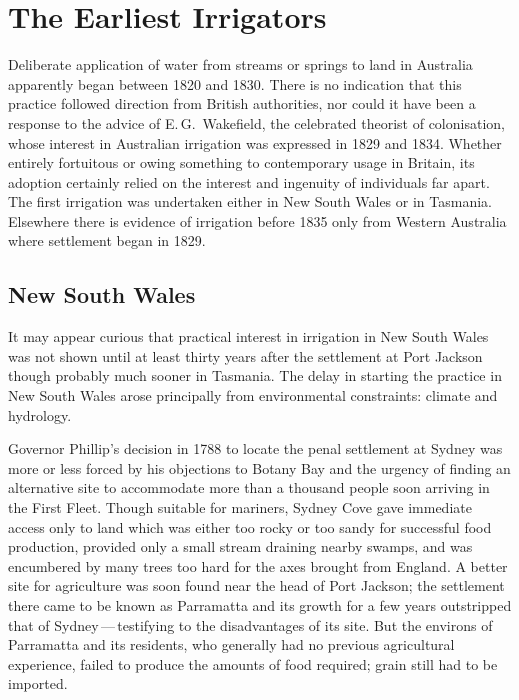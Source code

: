 
\chapter{The Earliest Irrigators}

\label{ch:early}

\setcounter{endnote}{0}

Deliberate application of water from streams or springs to land in
Australia apparently began between 1820 and 1830.  There is no
indication that this practice followed direction from British
authorities, nor could it have been a response to the advice of
E.\,G.~Wakefield, the celebrated theorist of
colonisation, whose interest in Australian irrigation was expressed in
1829 and 1834.  Whether entirely fortuitous or owing something to
contemporary usage in Britain, its adoption certainly
relied on the interest and ingenuity of individuals far apart.  The
first irrigation was undertaken either in New South Wales or in
Tasmania.  Elsewhere there is evidence of irrigation before 1835 only
from Western Australia where settlement began in 1829.

\section*{\textsf{New South Wales}}
\label{sec:nsw}

It may appear curious that practical interest in irrigation in New
South Wales was not shown until at least thirty years after the
settlement at Port Jackson though probably much sooner in Tasmania.
The delay in starting the practice in New South Wales arose
principally from environmental constraints: climate and hydrology.

Governor Phillip's decision in 1788 to locate
the penal settlement at Sydney was more or less
forced by his objections to Botany Bay and the
urgency of finding an alternative site to accommodate more than a
thousand people soon arriving in the First Fleet.  Though suitable for
mariners, Sydney Cove gave immediate access only to land which was
either too rocky or too sandy for successful food production, provided
only a small stream draining nearby swamps, and was encumbered by many
trees too hard for the axes brought from England.  A better site for
agriculture was soon found near the head of Port Jackson; the settlement there came to be known as Parramatta
 and its growth for a few years outstripped that
of Sydney\,---\,testifying to the disadvantages of its site.  But the
environs of Parramatta and its residents, who generally had no
previous agricultural experience, failed to produce the amounts of
food required; grain still had to be imported.

